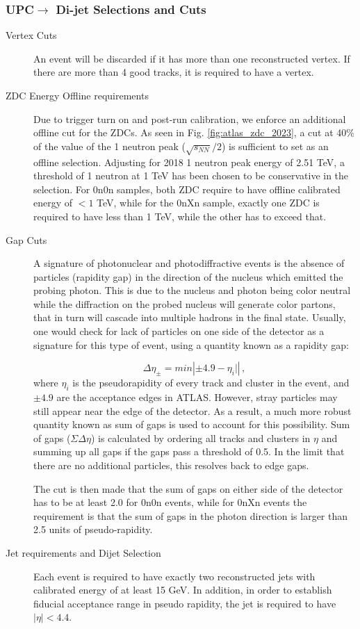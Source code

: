 \subsubsection{UPC$\rightarrow$ Di-jet Selections and Cuts}
\begin{description}
	\item [Vertex Cuts] An event will be discarded if it has more than one reconstructed  vertex.
	If there are more than 4 good tracks, it is required to have a vertex.
	
	\item [ZDC Energy Offline requirements] Due to trigger turn on and post-run calibration, we enforce an additional offline cut for the ZDCs. As seen in Fig. \ref{fig:atlas_zdc_2023}, a cut at 40\% of the value of the 1 neutron peak ($\sqrt{s_{NN}}/2$) is sufficient to set as an offline selection. Adjusting for 2018 1 neutron peak energy of 2.51 TeV, a threshold of 1 neutron at 1 TeV has been chosen to be conservative in the selection. For 0n0n samples, both ZDC require to have offline calibrated energy of $< 1$ TeV, while for the 0nXn sample, exactly one ZDC is required to have less than 1 TeV, while the other has to exceed that.
	
	\item [Gap Cuts] A signature of photonuclear and photodiffractive events is the absence of particles (rapidity gap) in the direction of the nucleus which emitted the probing photon. This is due to the nucleus and photon being color neutral while the diffraction on the probed nucleus will generate color partons, that in turn will cascade into multiple hadrons in the final state. Usually, one would check for lack of particles on one side of the detector as a signature for this type of event, using a quantity known as a rapidity gap: 
	
	\begin{equation}\label{eq:gap}
		\Delta\eta_{\pm} = min|{\pm 4.9 - \eta_{i}|}|\,,
	\end{equation}
	where $\eta_i$ is the pseudorapidity of every track and cluster in the event, and $\pm 4.9$ are the acceptance edges in ATLAS. However, stray particles may still appear  near the edge of the detector. As a result, a much more robust quantity known as sum of gaps is used to account for this possibility. Sum of gaps ($\Sigma\Delta\eta$) is calculated by ordering all tracks and clusters in $\eta$ and summing up all gaps if the gaps pass a threshold of 0.5. In the limit that there are no additional particles, this resolves back to edge gaps.
	
	The cut is then made that the sum of gaps on either side of the detector has to be at least 2.0 for 0n0n events, while for 0nXn events the requirement is that the sum of gaps in the photon direction is larger than 2.5 units of pseudo-rapidity.
	
	\item [Jet requirements and Dijet Selection] Each event is required to have exactly two reconstructed jets with calibrated energy of at least 15 GeV. In addition, in order to establish fiducial acceptance range in pseudo rapidity, the jet is required to have $|\eta|< 4.4$.
\end{description}


